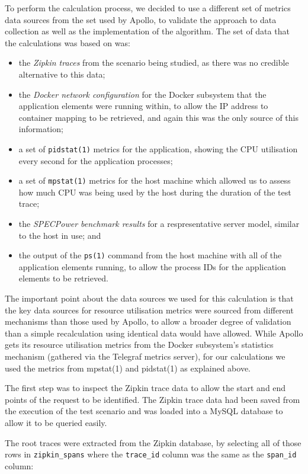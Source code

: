 To perform the calculation process, we decided to use a different set of metrics data sources from the set used by Apollo, to validate the approach to data collection as well as the implementation of the algorithm.  The set of data that the calculations was based on was:


\begin{itemize}
	\item the \emph{Zipkin traces} from the scenario being studied, as there was no credible alternative to this data;
	\item the \emph{Docker network configuration} for the Docker subsystem that the application elements were running within, to allow the IP address to container mapping to be retrieved, and again this was the only source of this information;
	\item a set of \texttt{pidstat(1)} metrics for the application, showing the CPU utilisation every second for the application processes;
	\item a set of \texttt{mpstat(1)} metrics for the host machine which allowed us to assess how much CPU was being used by the host during the duration of the test trace;
	\item the \emph{SPECPower benchmark results} for a respresentative server model, similar to the host in use; and
	\item the output of the \texttt{ps(1)} command from the host machine with all of the application elements running, to allow the process IDs for the application elements to be retrieved.
\end{itemize}

The important point about the data sources we used for this calculation is that the key data sources for resource utilisation metrics were sourced from different mechanisms than those used by Apollo, to allow a broader degree of validation than a simple recalculation using identical data would have allowed.  While Apollo gets its resource utilisation metrics from the Docker subsystem's statistics mechanism (gathered via the Telegraf metrics server), for our calculations we used the metrics from mpstat(1) and pidstat(1) as explained above.

The first step was to inspect the Zipkin trace data to allow the start and end points of the request to be identified.  The Zipkin trace data had been saved from the execution of the test scenario and was loaded into a MySQL database to allow it to be queried easily.

The root traces were extracted from the Zipkin database, by selecting all of those rows in \texttt{zipkin\_spans} where the \texttt{trace\_id} column was the same as the \texttt{span\_id} column:

